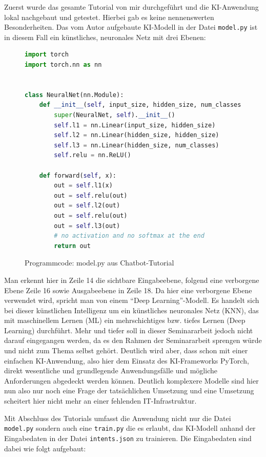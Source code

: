 \documentclass[12pt,oneside,titlepage,listof=totoc,bibliography=totoc]{scrartcl}
\newcommand{\code}[1]{\colorbox{code-gray}{\texttt{#1}}}
\begin{document}
Zuerst wurde das gesamte Tutorial von mir durchgeführt und die KI-Anwendung lokal nachgebaut und getestet. Hierbei gab es keine nennenswerten Besonderheiten. Das vom Autor aufgebaute KI-Modell in der Datei \code{model.py} ist in diesem Fall ein künstliches, neuronales Netz mit drei Ebenen:

\begin{figure}[H]
	\caption{Programmcode: model.py aus Chatbot-Tutorial}
	\label{fig:code-model-py-chatbot-tut}
\begin{lstlisting}[language=python]
import torch
import torch.nn as nn


class NeuralNet(nn.Module):
    def __init__(self, input_size, hidden_size, num_classes):
        super(NeuralNet, self).__init__()
        self.l1 = nn.Linear(input_size, hidden_size) 
        self.l2 = nn.Linear(hidden_size, hidden_size) 
        self.l3 = nn.Linear(hidden_size, num_classes)
        self.relu = nn.ReLU()
    
    def forward(self, x):
        out = self.l1(x)
        out = self.relu(out)
        out = self.l2(out)
        out = self.relu(out)
        out = self.l3(out)
        # no activation and no softmax at the end
        return out
\end{lstlisting}
\end{figure}

Man erkennt hier in Zeile 14 die sichtbare Eingabeebene, folgend eine verborgene Ebene Zeile 16 sowie Ausgabeebene in Zeile 18. Da hier eine verborgene Ebene verwendet wird, spricht man von einem \enquote{Deep Learning}-Modell. Es handelt sich bei dieser künstlichen Intelligenz um ein künstliches neuronales Netz (KNN), das mit maschinellem Lernen (ML) ein mehrschichtiges bzw. tiefes Lernen (Deep Learning) durchführt. Mehr und tiefer soll in dieser Seminararbeit jedoch nicht darauf eingegangen werden, da es den Rahmen der Seminararbeit sprengen würde und nicht zum Thema selbst gehört. Deutlich wird aber, dass schon mit einer einfachen KI-Anwendung, also hier dem Einsatz des KI-Frameworks PyTorch, direkt wesentliche und grundlegende Anwendungsfälle und mögliche Anforderungen abgedeckt werden können. Deutlich komplexere Modelle sind hier nun also nur noch eine Frage der tatsächlichen Umsetzung und eine Umsetzung scheitert hier nicht mehr an einer fehlenden IT-Infrastruktur.

Mit Abschluss des Tutorials umfasst die Anwendung nicht nur die Datei \code{model.py} sondern auch eine \code{train.py} die es erlaubt, das KI-Modell anhand der Eingabedaten in der Datei \code{intents.json} zu trainieren. Die Eingabedaten sind dabei wie folgt aufgebaut:
\end{document}
